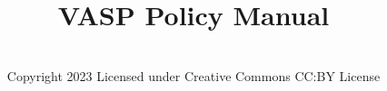 \documentclass[]{report}
\title{VASP Policy Manual}
\author{\firmfullname\\Copyright 2023 Licensed under Creative Commons
  CC:BY License}
\def\firmtag{twofish}
\begin{document}
\maketitle
\tableofcontents
\newpage
\listofcrossref
\newpage
\listofperiodic








\appendix


\end{document}

